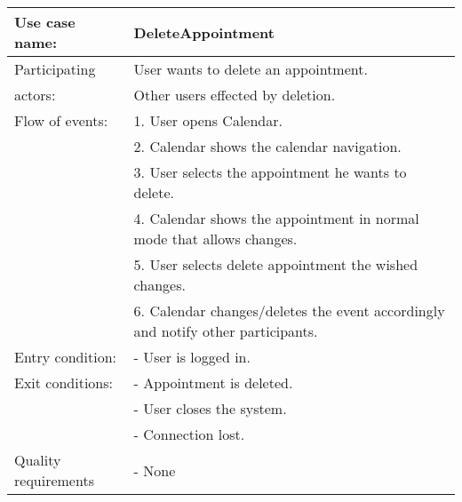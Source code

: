 {\tabulinesep=1.2mm
\begin{tabu}{ | p{3cm} | p{13cm} |}
    \hline
    Use case name: 			& 		DeleteAppointment\\ \hline
    Participating  			& 		User wants to delete an appointment. \\
    actors:					&		Other users effected by deletion.\\ \hline
    Flow of events: 		& 		1. User opens Calendar. \\
							&		2. Calendar shows the calendar navigation.\\
							&		3. User selects the appointment he wants to delete.\\
							&		4. Calendar shows the appointment in normal mode that allows changes.\\
							&		5. User selects delete appointment the wished changes.\\
							&		6. Calendar changes/deletes the event accordingly and notify other participants.\\\hline
    Entry condition: 		& 		- User is logged in.  \\ \hline
	Exit conditions: 		&		- Appointment is deleted.\\
							&		- User closes the system.\\
							&		- Connection lost.\\\hline
	Quality requirements	&	 	- None \\\hline
\end{tabu}
}